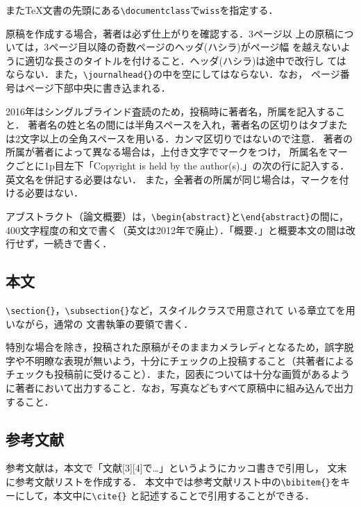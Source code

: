また\TeX 文書の先頭にある\verb|\documentclass|で\verb|wiss|を指定する．
\begin{document}
原稿を作成する場合，著者は必ず仕上がりを確認する．3ページ以
上の原稿については，3ページ目以降の奇数ページのヘッダ(ハシラ)がページ幅
を越えないように適切な長さのタイトルを付けること．ヘッダ(ハシラ)は途中で改行し
てはならない．また，\verb|\journalhead{}|の中を空にしてはならない．なお，
ページ番号はページ下部中央に書き込まれる．

2016年はシングルブラインド査読のため，投稿時に著者名，所属を記入すること．
著者名の姓と名の間には半角スペースを入れ，著者名の区切りはタブまたは2文字以上の全角スペースを用いる．カンマ区切りではないので注意．
著者の所属が著者によって異なる場合は，上付き文字でマークをつけ，
所属名をマークごとに1p目左下「Copyright is held by the author(s).」の次の行に記入する．英文名を併記する必要はない．
また，全著者の所属が同じ場合は，マークを付ける必要はない．

アブストラクト（論文概要）は，\verb|\begin{abstract}|と\verb|\end{abstract}|の間に，
400文字程度の和文で書く（英文は2012年で廃止）．「概要．」と概要本文の間は改行せず，一続きで書く．

\subsection{本文}

\verb|\section{}|，\verb|\subsection{}|など，スタイルクラスで用意されて
いる章立てを用いながら，通常の \LaTeXe 文書執筆の要領で書く．

特別な場合を除き，投稿された原稿がそのままカメラレディとなるため，誤字脱字や不明瞭な表現が無いよう，十分にチェックの上投稿すること（共著者によるチェックも投稿前に受けること）．また，図表については十分な画質があるように著者において出力すること．なお，写真などもすべて原稿中に組み込んで出力すること．

\subsection{参考文献}
参考文献は，本文で「文献[3][4]で…」というようにカッコ書きで引用し，
文末に参考文献リストを作成する．
本文中では参考文献リスト中の\verb|\bibitem{}|をキーにして，本文中に\verb|\cite{}|
と記述することで引用することができる．
\end{document}

